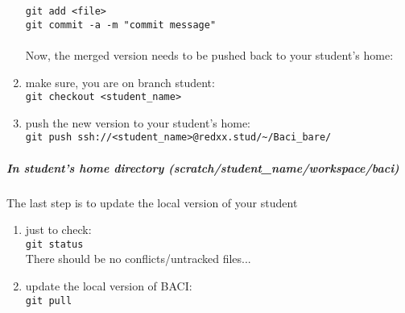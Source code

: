 \begin{enumerate}
    \texttt{git add <file>}\\
    \texttt{git commit -a -m "commit message"}\\\\
    Now, the merged version needs to be pushed back to your student's home:\\
    \item make sure, you are on branch student:\\
    \texttt{git checkout <student\_name>}
    \item push the new version to your student's home:\\
    \texttt{git push ssh://<student\_name>@redxx.stud/\~{}/Baci\_bare/}
    \end{enumerate}
\subparagraph{In student's home directory (scratch/student\_name/workspace/baci)\\}
    The last step is to update the local version of your student
    \begin{enumerate}
    \item just to check:\\
    \texttt{git status}\\
    There should be no conflicts/untracked files...
    \item update the local version of BACI:\\
    \texttt{git pull}\\
    \end{enumerate}
    
